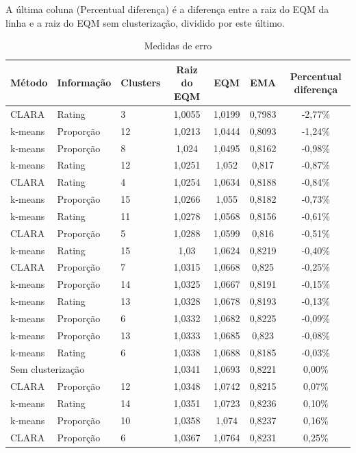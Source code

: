 \documentclass[12pt,a4paper,header]{abnt}
\begin{document}
A última coluna (Percentual diferença) é a diferença entre a raiz do EQM da linha e a raiz do EQM sem clusterização, dividido por este último.

{\setlength\tabcolsep{3.5pt}
\begin{longtable}{@{}lllcccc@{}}
\caption{Medidas de erro}
\label{erros_rec_full}\\
\toprule
\textbf{Método} & \textbf{Informação} & \textbf{Clusters} & \textbf{Raiz do EQM} & \textbf{EQM} & \textbf{EMA} & \textbf{Percentual diferença} \\* \midrule
\endhead
%
\bottomrule
\endfoot
%
\endlastfoot
%
CLARA & Rating & 3 & 1,0055 & 1,0199 & 0,7983 & -2,77\% \\
k-means & Proporção & 12 & 1,0213 & 1,0444 & 0,8093 & -1,24\% \\
k-means & Proporção & 8 & 1,024 & 1,0495 & 0,8162 & -0,98\% \\
k-means & Rating & 12 & 1,0251 & 1,052 & 0,817 & -0,87\% \\
CLARA & Rating & 4 & 1,0254 & 1,0634 & 0,8188 & -0,84\% \\
k-means & Proporção & 15 & 1,0266 & 1,055 & 0,8182 & -0,73\% \\
k-means & Rating & 11 & 1,0278 & 1,0568 & 0,8156 & -0,61\% \\
CLARA & Proporção & 5 & 1,0288 & 1,0599 & 0,816 & -0,51\% \\
k-means & Rating & 15 & 1,03 & 1,0624 & 0,8219 & -0,40\% \\
CLARA & Proporção & 7 & 1,0315 & 1,0668 & 0,825 & -0,25\% \\
k-means & Proporção & 14 & 1,0325 & 1,0667 & 0,8191 & -0,15\% \\
k-means & Rating & 13 & 1,0328 & 1,0678 & 0,8193 & -0,13\% \\
k-means & Proporção & 6 & 1,0332 & 1,0682 & 0,8225 & -0,09\% \\
k-means & Proporção & 13 & 1,0333 & 1,0685 & 0,823 & -0,08\% \\
k-means & Rating & 6 & 1,0338 & 1,0688 & 0,8185 & -0,03\% \\
\multicolumn{3}{l}{Sem clusterização} & 1,0341 & 1,0693 & 0,8221 & 0,00\% \\
CLARA & Proporção & 12 & 1,0348 & 1,0742 & 0,8215 & 0,07\% \\
k-means & Rating & 14 & 1,0351 & 1,0723 & 0,8236 & 0,10\% \\
k-means & Proporção & 10 & 1,0358 & 1,074 & 0,8237 & 0,16\% \\
CLARA & Proporção & 6 & 1,0367 & 1,0764 & 0,8231 & 0,25\% \\

\end{longtable}}
\end{document}
